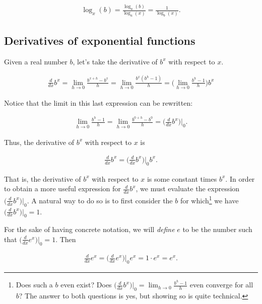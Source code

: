 \begin{align*}
    \log_x(b) = \frac{\log_a(b)}{\log_a(x)} = \frac{1}{\log_b(x)}.
\end{align*}

\subsection*{Derivatives of exponential functions}

Given a real number $b$, let's take the derivative of $b^x$ with respect to $x$.

\begin{align*}
    \frac{d}{dx} b^x = \lim_{h \rightarrow 0} \frac{b^{x + h} - b^x}{h}
    = \lim_{h \rightarrow 0} \frac{b^x (b^h - 1)}{h}
    = \Big( \lim_{h \rightarrow 0} \frac{b^h - 1}{h} \Big) b^x
\end{align*}

Notice that the limit in this last expression can be rewritten:

\begin{align*}
    \lim_{h \rightarrow 0} \frac{b^h - 1}{h} = \lim_{h \rightarrow 0} \frac{b^{0 + h} - b^0}{h} = \Big( \frac{d}{dx} b^x \Big)\Big|_0.
\end{align*}

Thus, the derivative of $b^x$ with respect to $x$ is

\begin{align*}
   \frac{d}{dx} b^x = \Big( \frac{d}{dx} b^x \Big)\Big|_0 b^x.
\end{align*}

That is, the derivative of $b^x$ with respect to $x$ is some constant times $b^x$. In order to obtain a more useful expression for $\frac{d}{dx} b^x$, we must evaluate the expression $\Big( \frac{d}{dx} b^x \Big)\Big|_0$. A natural way to do so is to first consider the $b$ for which\footnote{Does such a $b$ even exist? Does $\Big( \frac{d}{dx} b^x \Big)\Big|_0 = \lim_{h \rightarrow 0} \frac{b^h - 1}{h}$ even converge for all $b$? The answer to both questions is yes, but showing so is quite technical.} we have $\Big( \frac{d}{dx} b^x \Big)\Big|_0 = 1$.

For the sake of having concrete notation, we will \textit{define} $e$ to be the number such that $\Big( \frac{d}{dx} e^x \Big)\Big|_0 = 1$. Then

\begin{align*}
    \frac{d}{dx} e^x = \Big( \frac{d}{dx} e^x \Big)\Big|_0 e^x = 1 \cdot e^x = e^x.
\end{align*}


